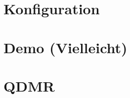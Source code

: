 \documentclass[aspectratio=169]{beamer}
\begin{document}
\section{Konfiguration}
\begin{frame}

\end{frame}

\section{Demo (Vielleicht)}
\begin{frame}

\end{frame}

\section{QDMR}
\begin{frame}

\end{frame}
\end{document}
